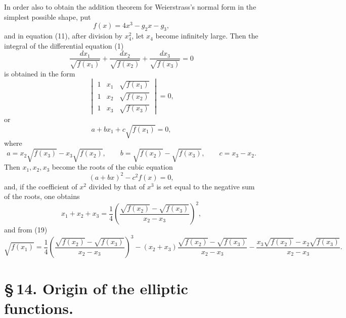 \documentclass[11pt]{article}
\begin{document}
In order also to obtain the addition theorem for Weierstrass's normal form in the simplest possible shape, put
\[
f(x)=4x^3-g_2x-g_3,
\]
and in equation (11), after division by $x_4^2$, let $x_4$ become infinitely large. Then the integral of the differential equation (1)
\[
\frac{dx_1}{\sqrt{f(x_1)}}+
\frac{dx_2}{\sqrt{f(x_2)}}+
\frac{dx_3}{\sqrt{f(x_3)}}=0
\]
is obtained in the form
\begin{equation}
\begin{vmatrix}
1&x_1&\sqrt{f(x_1)}\\
1&x_2&\sqrt{f(x_2)}\\
1&x_3&\sqrt{f(x_3)}
\end{vmatrix}=0,
\tag{18}
\end{equation}
or
\begin{equation}
a+bx_1+c\sqrt{f(x_1)}=0,
\tag{19}
\end{equation}
where
\begin{equation}
a=x_2\sqrt{f(x_3)}-x_3\sqrt{f(x_2)},\qquad
b=\sqrt{f(x_2)}-\sqrt{f(x_3)},\qquad
c=x_3-x_2.
\tag{20}
\end{equation}
Then $x_1,x_2,x_3$ become the roots of the cubic equation
\[
(a+bx)^2-c^2f(x)=0,
\]
and, if the coefficient of $x^2$ divided by that of $x^3$ is set equal to the negative sum of the roots, one obtains
\begin{equation}
x_1+x_2+x_3=\frac14\left(\frac{\sqrt{f(x_2)}-\sqrt{f(x_3)}}{x_2-x_3}\right)^2,
\tag{21}
\end{equation}
and from (19)
\begin{equation}
\sqrt{f(x_1)}
=
\frac14\left(\frac{\sqrt{f(x_2)}-\sqrt{f(x_3)}}{x_2-x_3}\right)^3
-(x_2+x_3)\frac{\sqrt{f(x_2)}-\sqrt{f(x_3)}}{x_2-x_3}
-\frac{x_3\sqrt{f(x_2)}-x_2\sqrt{f(x_3)}}{x_2-x_3}.
\tag{22}
\end{equation}

\section*{\S\,14. Origin of the elliptic functions.}
\end{document}
